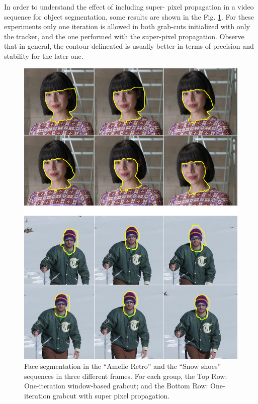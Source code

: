 \documentclass[a4paper, 10pt, conference]{ieeeconf}      %
\begin{document}
In order to understand the effect of including super-
pixel propagation in a video sequence for object
segmentation, some results are shown in the Fig.
\ref{figurelabel_comp}. For these experiments only one iteration is
allowed in both grab-cuts initialized with only the
tracker, and the one performed with the super-pixel
propagation. Observe that in general, the contour
delineated is usually better in terms of precision and
stability for the later one.

   \begin{figure}[thpb]
      \centering
      \includegraphics[height=0.4\textheight]{images/Compare.png}
      \caption{Face segmentation in the “Amelie Retro” and the
	      “Snow shoes” sequences in three different frames. For each
	       group, the Top Row: One-iteration window-based grabcut;
	       and the Bottom Row: One-iteration grabcut with super pixel
	       propagation.}
      \label{figurelabel_comp}
   \end{figure}
   
\end{document}
